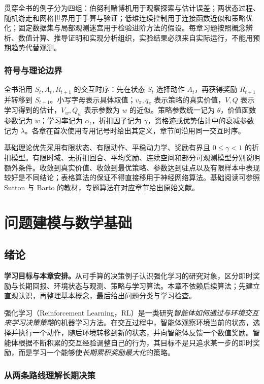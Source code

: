 \documentclass[UTF8,12pt,a4paper,fontset=fandol]{ctexbook}
\begin{document}
贯穿全书的例子分为四组：伯努利赌博机用于观察探索与估计误差；两状态过程、随机游走和网格世界用于手算与验证；低维连续控制用于连接函数近似和策略优化；固定数据集与局部观测迷宫用于检验进阶方法的假设。每章习题按照概念辨析、数值计算、推导证明和实现分析组织，实验结果必须来自实际运行，不能用预期趋势代替观测。

\section*{符号与理论边界}

全书沿用 $S_t,A_t,R_{t+1}$ 的交互时序：先在状态 $S_t$ 选择动作 $A_t$，再获得奖励 $R_{t+1}$ 并转移到 $S_{t+1}$。小写字母表示具体取值；$v_\pi,q_\pi$ 表示策略的真实价值，$V,Q$ 表示学习得到的估计，$V_w,Q_w$ 表示参数为 $w$ 的近似。策略参数统一记为 $\theta$，价值函数参数记为 $w$；学习率记为 $\alpha_t$，折扣因子记为 $\gamma$，资格迹或优势估计中的衰减参数记为 $\lambda$。各章在首次使用专用记号时给出其定义，章节间沿用同一交互时序。

基础理论优先采用有限状态、有限动作、平稳动力学、奖励有界且 $0\leq\gamma<1$ 的折扣模型。有限时域、无折扣回合、平均奖励、连续空间和部分可观测模型分别说明额外条件。收敛到真实价值、收敛到最优策略、参数达到驻点以及有限样本中表现较好是不同结论；表格算法的保证不得直接移用于神经网络算法。基础阅读可参照 Sutton 与 Barto 的教材\cite{sutton-barto}，专题算法在对应章节给出原始文献。

\part{问题建模与数学基础}

\chapter{绪论}
\label{ch:rl-introduction}

\textbf{学习目标与本章安排。}从可手算的决策例子认识强化学习的研究对象，区分即时奖励与长期回报、环境状态与观测、策略与学习算法。本章不依赖后续算法；先建立直观认识，再整理基本概念，最后给出问题分类与学习检查。

强化学习（Reinforcement Learning，RL）是一类研究\emph{智能体如何通过与环境交互来学习决策策略}的机器学习方法。在交互过程中，智能体观察环境当前的状态，选择并执行一个动作，随后环境转移到新的状态，并向智能体反馈一个数值奖励。智能体根据不断积累的交互经验调整自己的行为，其目标不是只追求某一步的即时奖励，而是学习一个能够使\emph{长期累积奖励最大化}的策略。

\section{从两条路线理解长期决策}
\end{document}
